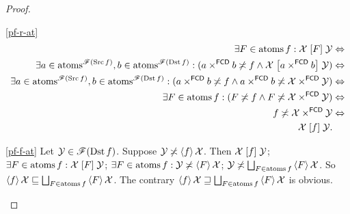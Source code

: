 \begin{proof}
~
\begin{widedisorder}
\item [{\ref{pf-r-at}}] ~
\begin{align*}
\exists F\in\operatorname{atoms} f:\mathcal{X}\mathrel{\left[F\right]}\mathcal{Y} & \Leftrightarrow\\
\exists a\in\operatorname{atoms}^{\mathscr{F}(\operatorname{Src} f)},b\in\operatorname{atoms}^{\mathscr{F}(\operatorname{Dst} f)}:(a\times^{\mathsf{FCD}}b\not\asymp f\land\mathcal{X}\mathrel{\left[a\times^{\mathsf{FCD}}b\right]}\mathcal{Y}) & \Leftrightarrow\\
\exists a\in\operatorname{atoms}^{\mathscr{F}(\operatorname{Src} f)},b\in\operatorname{atoms}^{\mathscr{F}(\operatorname{Dst} f)}:(a\times^{\mathsf{FCD}}b\not\asymp f\land a\times^{\mathsf{FCD}}b\not\asymp\mathcal{X}\times^{\mathsf{FCD}}\mathcal{Y}) & \Leftrightarrow\\
\exists F\in\operatorname{atoms} f:(F\not\asymp f\land F\not\asymp\mathcal{X}\times^{\mathsf{FCD}}\mathcal{Y}) & \Leftrightarrow\\
f\not\asymp\mathcal{X}\times^{\mathsf{FCD}}\mathcal{Y} & \Leftrightarrow\\
\mathcal{X}\mathrel{\left[f\right]}\mathcal{Y}.
\end{align*}

\item [{\ref{pf-f-at}}] Let $\mathcal{Y}\in\mathscr{F}(\operatorname{Dst} f)$. Suppose
$\mathcal{Y}\not\asymp\left\langle f\right\rangle\mathcal{X}$. Then $\mathcal{X}\mathrel{\left[f\right]}\mathcal{Y}$;
$\exists F\in\operatorname{atoms} f:\mathcal{X}\mathrel{\left[F\right]}\mathcal{Y}$; $\exists F\in\operatorname{atoms} f:\mathcal{Y}\not\asymp\left\langle F\right\rangle\mathcal{X}$;
$\mathcal{Y}\not\asymp\bigsqcup_{F\in\operatorname{atoms} f}\left\langle F\right\rangle\mathcal{X}$.
So $\left\langle f\right\rangle\mathcal{X}\sqsubseteq\bigsqcup_{F\in\operatorname{atoms} f}\left\langle F\right\rangle\mathcal{X}$.
The contrary $\left\langle f\right\rangle\mathcal{X}\sqsupseteq\bigsqcup_{F\in\operatorname{atoms} f}\left\langle F\right\rangle\mathcal{X}$
is obvious.
\end{widedisorder}
\end{proof}

